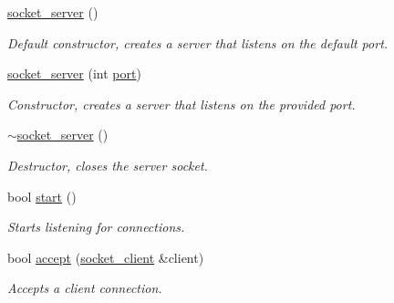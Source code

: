 \begin{DoxyCompactItemize}
\item 
\mbox{\label{classcpen333_1_1process_1_1windows_1_1socket__server_a719c448f8f7f7b48dd54ac426e18fdfe}} 
\hyperlink{classcpen333_1_1process_1_1windows_1_1socket__server_a719c448f8f7f7b48dd54ac426e18fdfe}{socket\+\_\+server} ()
\begin{DoxyCompactList}\small\item\em Default constructor, creates a server that listens on the default port. \end{DoxyCompactList}\item 
\hyperlink{classcpen333_1_1process_1_1windows_1_1socket__server_ada3d9f2a11e196dc91b3199b37fe50e2}{socket\+\_\+server} (int \hyperlink{classcpen333_1_1process_1_1windows_1_1socket__server_a4b5f9231c046f947a77a6458202c2712}{port})
\begin{DoxyCompactList}\small\item\em Constructor, creates a server that listens on the provided port. \end{DoxyCompactList}\item 
\mbox{\label{classcpen333_1_1process_1_1windows_1_1socket__server_a83cf30c312cacb0bbabb2c14b32fff88}} 
\hyperlink{classcpen333_1_1process_1_1windows_1_1socket__server_a83cf30c312cacb0bbabb2c14b32fff88}{$\sim$socket\+\_\+server} ()
\begin{DoxyCompactList}\small\item\em Destructor, closes the server socket. \end{DoxyCompactList}\item 
bool \hyperlink{classcpen333_1_1process_1_1windows_1_1socket__server_a0a2021766c8d5728d044a96d24bbc684}{start} ()
\begin{DoxyCompactList}\small\item\em Starts listening for connections. \end{DoxyCompactList}\item 
bool \hyperlink{classcpen333_1_1process_1_1windows_1_1socket__server_aee5db9af683de8a0b26272a25661aa40}{accept} (\hyperlink{classcpen333_1_1process_1_1windows_1_1socket__client}{socket\+\_\+client} \&client)
\begin{DoxyCompactList}\small\item\em Accepts a client connection. \end{DoxyCompactList}\item 

\end{DoxyCompactItemize}
